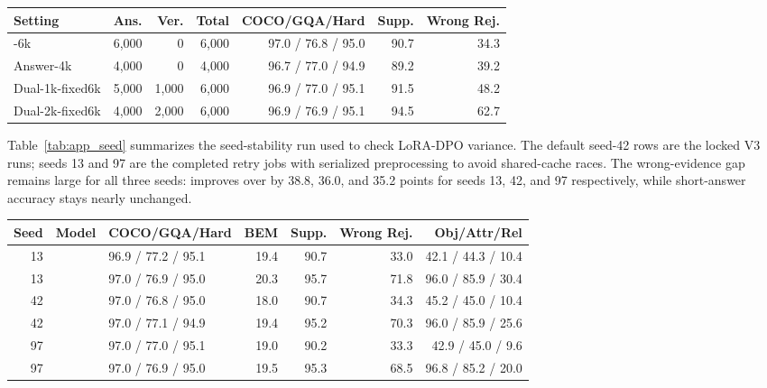 \begin{center}
\begin{minipage}{\linewidth}
\centering
\scriptsize
\setlength{\tabcolsep}{3.2pt}
\begin{tabular}{@{}lrrrrrr@{}}
\toprule
Setting & Ans. & Ver. & Total & COCO/GQA/Hard & Supp. & Wrong Rej. \\
\midrule
\answerdpo{}-6k & 6{,}000 & 0 & 6{,}000 & 97.0 / 76.8 / 95.0 & 90.7 & 34.3 \\
Answer-4k & 4{,}000 & 0 & 4{,}000 & 96.7 / 77.0 / 94.9 & 89.2 & 39.2 \\
Dual-1k-fixed6k & 5{,}000 & 1{,}000 & 6{,}000 & 96.9 / 77.0 / 95.1 & 91.5 & 48.2 \\
Dual-2k-fixed6k & 4{,}000 & 2{,}000 & 6{,}000 & 96.9 / 76.9 / 95.1 & 94.5 & 62.7 \\
\bottomrule
\end{tabular}
\label{tab:app_fixed_budget}
\end{minipage}
\end{center}

Table~\ref{tab:app_seed} summarizes the seed-stability run used to check
LoRA-DPO variance. The default seed-42 rows are the locked V3 runs; seeds 13
and 97 are the completed retry jobs with serialized preprocessing to avoid
shared-cache races. The wrong-evidence gap remains large for all three seeds:
\dualtwok{} improves over \answerdpo{} by 38.8, 36.0, and 35.2 points for
seeds 13, 42, and 97 respectively, while short-answer accuracy stays nearly
unchanged.

\begin{center}
\begin{minipage}{\linewidth}
\centering
\scriptsize
\setlength{\tabcolsep}{3.2pt}
\begin{tabular}{@{}rllrrrr@{}}
\toprule
Seed & Model & COCO/GQA/Hard & BEM & Supp. & Wrong Rej. & Obj/Attr/Rel \\
\midrule
13 & \answerdpo{} & 96.9 / 77.2 / 95.1 & 19.4 & 90.7 & 33.0 & 42.1 / 44.3 / 10.4 \\
13 & \dualtwok{} & 97.0 / 76.9 / 95.0 & 20.3 & 95.7 & 71.8 & 96.0 / 85.9 / 30.4 \\
42 & \answerdpo{} & 97.0 / 76.8 / 95.0 & 18.0 & 90.7 & 34.3 & 45.2 / 45.0 / 10.4 \\
42 & \dualtwok{} & 97.0 / 77.1 / 94.9 & 19.4 & 95.2 & 70.3 & 96.0 / 85.9 / 25.6 \\
97 & \answerdpo{} & 97.0 / 77.0 / 95.1 & 19.0 & 90.2 & 33.3 & 42.9 / 45.0 / 9.6 \\
97 & \dualtwok{} & 97.0 / 76.9 / 95.0 & 19.5 & 95.3 & 68.5 & 96.8 / 85.2 / 20.0 \\
\bottomrule
\end{tabular}
\label{tab:app_seed}
\end{minipage}
\end{center}


